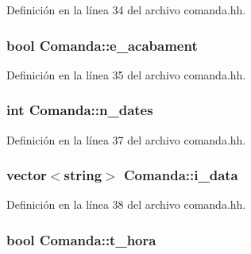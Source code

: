 Definición en la línea 34 del archivo comanda.\-hh.

\hypertarget{class_comanda_a0f7472af37d7f6c24f74fbac60e4a696}{
\subsubsection[{e\-\_\-acabament}]{\setlength{\rightskip}{0pt plus 5cm}bool Comanda\-::e\-\_\-acabament\hspace{0.3cm}{\ttfamily [private]}}}\label{class_comanda_a0f7472af37d7f6c24f74fbac60e4a696}


Definición en la línea 35 del archivo comanda.\-hh.

\hypertarget{class_comanda_a0a4e13d8edba10c69d1b058d8fc6a7c3}{
\subsubsection[{n\-\_\-dates}]{\setlength{\rightskip}{0pt plus 5cm}int Comanda\-::n\-\_\-dates\hspace{0.3cm}{\ttfamily [private]}}}\label{class_comanda_a0a4e13d8edba10c69d1b058d8fc6a7c3}


Definición en la línea 37 del archivo comanda.\-hh.

\hypertarget{class_comanda_a06ee1d3173ee0ae52c588689e9263099}{
\subsubsection[{i\-\_\-data}]{\setlength{\rightskip}{0pt plus 5cm}vector$<$string$>$ Comanda\-::i\-\_\-data\hspace{0.3cm}{\ttfamily [private]}}}\label{class_comanda_a06ee1d3173ee0ae52c588689e9263099}


Definición en la línea 38 del archivo comanda.\-hh.

\hypertarget{class_comanda_ae481194a2016e940e655173e897d214d}{
\subsubsection[{t\-\_\-hora}]{\setlength{\rightskip}{0pt plus 5cm}bool Comanda\-::t\-\_\-hora\hspace{0.3cm}{\ttfamily [private]}}}\label{class_comanda_ae481194a2016e940e655173e897d214d}


